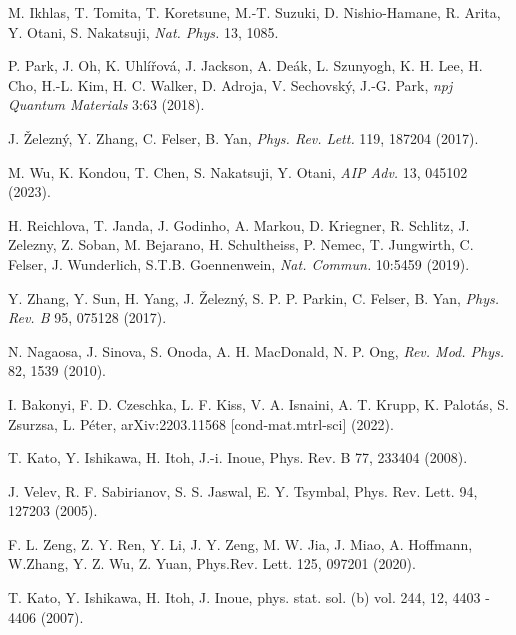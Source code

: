 \documentclass[prb,showpacs,amsmath,amssymb,superscriptaddress,twocolumn,floatfix]{revtex4-1}
\begin{document}
\begin{thebibliography}{99}
 M. Ikhlas, T. Tomita, T. Koretsune, M.-T. Suzuki, D. Nishio-Hamane, R. Arita, Y. Otani, S. Nakatsuji, \textit{Nat. Phys.} 13, 1085. %

 P. Park, J. Oh, K. Uhl\'i\v{r}ov\'a, J. Jackson, A. De\'ak, L. Szunyogh, K. H. Lee, H. Cho, H.-L. Kim, H. C. Walker, D. Adroja, V. Sechovsk\'y, J.-G. Park, \textit{npj Quantum Materials} 3:63 (2018). %

 J. \v{Z}elezn\'y, Y. Zhang, C. Felser, B. Yan, \textit{Phys. Rev. Lett.} 119, 187204 (2017). %

 M. Wu, K. Kondou, T. Chen, S. Nakatsuji, Y. Otani, \textit{AIP Adv.} 13, 045102 (2023). %

 H. Reichlova, T. Janda, J. Godinho, A. Markou, D. Kriegner, R. Schlitz, J. Zelezny, Z. Soban, M. Bejarano, H. Schultheiss, P. Nemec, T. Jungwirth, C. Felser, J. Wunderlich,  S.T.B. Goennenwein, \textit{Nat. Commun.} 10:5459 (2019). %

 Y. Zhang, Y. Sun, H. Yang, J. \v{Z}elezn\'y, S. P. P. Parkin, C. Felser, B. Yan, \textit{Phys. Rev. B} 95, 075128 (2017). %

 N. Nagaosa, J. Sinova, S. Onoda, A. H. MacDonald, N. P. Ong, \textit{Rev. Mod. Phys.} 82, 1539 (2010). %
    
 I. Bakonyi, F. D. Czeschka, L. F. Kiss, V. A. Isnaini, A. T. Krupp, K. Palot\'as, S. Zsurzsa, L. P\'eter, arXiv:2203.11568 [cond-mat.mtrl-sci] (2022). %

 T. Kato, Y. Ishikawa, H. Itoh, J.-i. Inoue, Phys. Rev. B 77, 233404 (2008). %

 J. Velev, R. F. Sabirianov, S. S. Jaswal, E. Y. Tsymbal, Phys. Rev. Lett. 94, 127203 (2005). %

 F. L. Zeng, Z. Y. Ren, Y. Li, J. Y. Zeng, M. W. Jia, J. Miao, A. Hoffmann, W.Zhang, Y. Z. Wu, Z. Yuan, Phys.Rev. Lett. 125, 097201 (2020). %

 T. Kato, Y. Ishikawa, H. Itoh, J. Inoue, phys. stat. sol. (b) vol. 244, 12, 4403 - 4406 (2007). %


\end{thebibliography}
\end{document}
